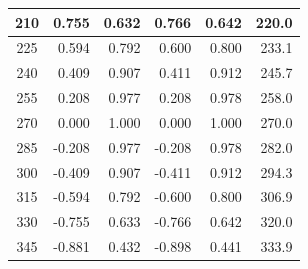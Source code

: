 \begin{table}[htbp]
\begin{center}
\begin{tabular}{|p{15 mm}|p{15 mm}|p{15 mm}|p{15 mm}|p{15 mm}|p{15 mm}|}
            \multicolumn{1}{|c|}{210}                  & \multicolumn{1}{|r|}{0.755}                     & \multicolumn{1}{|r|}{0.632}      & \multicolumn{1}{|r|}{0.766}      & \multicolumn{1}{|r|}{0.642}         & \multicolumn{1}{|r|}{220.0}      \\ \hline
            \multicolumn{1}{|c|}{225}                  & \multicolumn{1}{|r|}{0.594}                     & \multicolumn{1}{|r|}{0.792}      & \multicolumn{1}{|r|}{0.600}      & \multicolumn{1}{|r|}{0.800}         & \multicolumn{1}{|r|}{233.1}      \\ \hline
            \multicolumn{1}{|c|}{240}                  & \multicolumn{1}{|r|}{0.409}                     & \multicolumn{1}{|r|}{0.907}      & \multicolumn{1}{|r|}{0.411}      & \multicolumn{1}{|r|}{0.912}         & \multicolumn{1}{|r|}{245.7}      \\ \hline
            \multicolumn{1}{|c|}{255}                  & \multicolumn{1}{|r|}{0.208}                     & \multicolumn{1}{|r|}{0.977}      & \multicolumn{1}{|r|}{0.208}      & \multicolumn{1}{|r|}{0.978}         & \multicolumn{1}{|r|}{258.0}      \\ \hline
            \multicolumn{1}{|c|}{270}                  & \multicolumn{1}{|r|}{0.000}                     & \multicolumn{1}{|r|}{1.000}      & \multicolumn{1}{|r|}{0.000}      & \multicolumn{1}{|r|}{1.000}         & \multicolumn{1}{|r|}{270.0}      \\ \hline
            \multicolumn{1}{|c|}{285}                  & \multicolumn{1}{|r|}{-0.208}                    & \multicolumn{1}{|r|}{0.977}      & \multicolumn{1}{|r|}{-0.208}     & \multicolumn{1}{|r|}{0.978}         & \multicolumn{1}{|r|}{282.0}      \\ \hline
            \multicolumn{1}{|c|}{300}                  & \multicolumn{1}{|r|}{-0.409}                    & \multicolumn{1}{|r|}{0.907}      & \multicolumn{1}{|r|}{-0.411}     & \multicolumn{1}{|r|}{0.912}         & \multicolumn{1}{|r|}{294.3}      \\ \hline
            \multicolumn{1}{|c|}{315}                  & \multicolumn{1}{|r|}{-0.594}                    & \multicolumn{1}{|r|}{0.792}      & \multicolumn{1}{|r|}{-0.600}     & \multicolumn{1}{|r|}{0.800}         & \multicolumn{1}{|r|}{306.9}      \\ \hline
            \multicolumn{1}{|c|}{330}                  & \multicolumn{1}{|r|}{-0.755}                    & \multicolumn{1}{|r|}{0.633}      & \multicolumn{1}{|r|}{-0.766}     & \multicolumn{1}{|r|}{0.642}         & \multicolumn{1}{|r|}{320.0}      \\ \hline
            \multicolumn{1}{|c|}{345}                  & \multicolumn{1}{|r|}{-0.881}                    & \multicolumn{1}{|r|}{0.432}      & \multicolumn{1}{|r|}{-0.898}     & \multicolumn{1}{|r|}{0.441}         & \multicolumn{1}{|r|}{333.9}      \\ \hline
        \end{tabular}
    \end{center}
\end{table}

